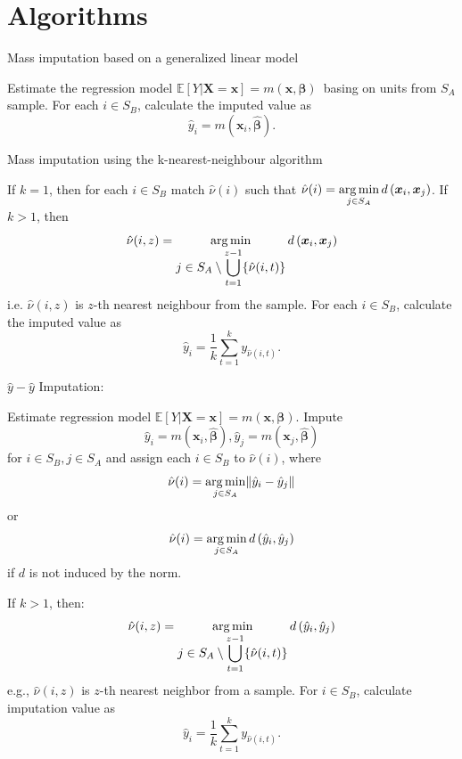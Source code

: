 \documentclass[
]{jss}
\begin{document}
\clearpage

\section{Algorithms}\label{sec-details}

\begin{algorithm}[ht!]
\caption{Mass imputation based on a generalized linear model}
\label{algo-1}
\begin{algorithmic}[1]
 \State Estimate the regression model $\mathbb{E}[Y|\boldsymbol{X}=\boldsymbol{x}]=m(\boldsymbol{x}, \boldsymbol{\beta})$\ basing on units from $S_A$ sample.
 \State For each $i \in S_B$, calculate the imputed value as
 $$
 \hat{y}_i = m\left(\boldsymbol{x}_{i},\hat{\boldsymbol{\beta}}\right).
 $$
\end{algorithmic}
\end{algorithm}

\begin{algorithm}[ht!]
\caption{Mass imputation using the k-nearest-neighbour algorithm}
\label{algo-2}
\begin{algorithmic}[1]
\State If $k=1$, then for each $i \in S_B$ match $\hat{\nu}(i)$ such that
$\displaystyle \hat{\nu}(i)=
\operatornamewithlimits{arg\,min}_{j\in S_{A}}d\left(\boldsymbol{x}_i,\boldsymbol{x}_j\right)$.
\State If $k>1$, then
$$\hat{\nu}(i, z) = \operatornamewithlimits{arg\,min}_{\displaystyle j\in S_{A}\setminus\bigcup_{t=1}^{z-1}
\{\hat{\nu}(i, t)\}} d\left(\boldsymbol{x}_i, \boldsymbol{x}_j\right)$$
i.e. $\hat{\nu}(i, z)$ is $z$-th nearest neighbour from the sample.\;
\State For each $i \in S_B$, calculate the imputed value as
$$
\hat{y}_i = \frac{1}{k}\sum_{t=1}^{k}y_{\hat{\nu}(i, t)}.
$$
\end{algorithmic}
\end{algorithm}

\begin{algorithm}[ht!]
\caption{$\hat{y}-\hat{y}$ Imputation:}
\label{algo-3}
\begin{algorithmic}[1]
\State Estimate regression model $\mathbb{E}[Y|\boldsymbol{X}=\boldsymbol{x}]=m(\boldsymbol{x}, \boldsymbol{\beta})$.\;
\State Impute $$\hat{y}_{i}=m\left(\boldsymbol{x}_{i},\hat{\boldsymbol{\beta}}\right), 
\hat{y}_{j}=m\left(\boldsymbol{x}_{j},\hat{\boldsymbol{\beta}}\right)$$
for $i\in S_{B}, j\in S_{A}$ and assign each 
$i\in S_{B}$ to $\hat{\nu}(i)$, where
$$\displaystyle \hat{\nu}(i)=
\operatornamewithlimits{arg\,min}_{j\in S_{A}}\lVert \hat{y}_{i}-\hat{y}_{j}\rVert$$ or
$$\displaystyle \hat{\nu}(i)=
\operatornamewithlimits{arg\,min}_{j\in S_{A}}d\left(\hat{y}_{i},\hat{y}_{j}\right)$$ if $d$ is not induced by the norm.\;

\State If $k>1$, then:
$$\hat{\nu}(i, z) = \operatornamewithlimits{arg\,min}_{\displaystyle j\in S_{A}\setminus\bigcup_{t=1}^{z-1}
\{\hat{\nu}(i, t)\}} d\left(\hat{y}_{i},\hat{y}_{j}\right)$$
e.g., $\hat{\nu}(i, z)$ is $z$-th nearest neighbor from a sample.\;
\State For $i \in S_B$, calculate imputation value as 
$$
\hat{y}_i = \frac{1}{k}\sum_{t=1}^{k}y_{\hat{\nu}(i, t)}.
$$
\end{algorithmic}
\end{algorithm}
\end{document}
